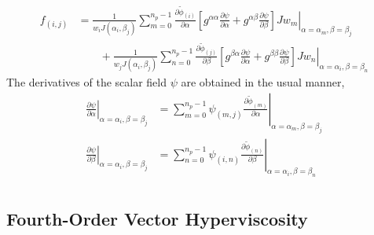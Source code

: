 \documentclass{article}
\newcommand{\pdiff}[2]{\frac{\partial #1}{\partial #2}}
\begin{document}
\begin{align}
f_{(i,j)} &= \frac{1}{w_i J(\alpha_i, \beta_j)} \sum_{m=0}^{n_p-1} \pdiff{\tilde{\phi}_{(i)}}{\alpha} \left. \left[ g^{\alpha \alpha} \pdiff{\psi}{\alpha} + g^{\alpha \beta} \pdiff{\psi}{\beta} \right] J w_m \right\vert_{\alpha = \alpha_m, \beta = \beta_j} \nonumber \\
& \qquad + \frac{1}{w_j J(\alpha_i, \beta_j)} \sum_{n=0}^{n_p-1} \pdiff{\tilde{\phi}_{(j)}}{\beta} \left. \left[ g^{\beta \alpha} \pdiff{\psi}{\alpha} + g^{\beta \beta} \pdiff{\psi}{\beta} \right] J w_n \right\vert_{\alpha = \alpha_i, \beta = \beta_n}
\end{align}  The derivatives of the scalar field $\psi$ are obtained in the usual manner,
\begin{align}
\left. \pdiff{\psi}{\alpha} \right\vert_{\alpha = \alpha_i, \beta = \beta_j} &= \sum_{m=0}^{n_p-1} \left. \psi_{(m,j)} \pdiff{\tilde{\phi}_{(m)}}{\alpha} \right\vert_{\alpha = \alpha_m, \beta = \beta_j} \\
\left. \pdiff{\psi}{\beta} \right\vert_{\alpha = \alpha_i, \beta = \beta_j} &= \sum_{n=0}^{n_p-1} \left. \psi_{(i,n)} \pdiff{\tilde{\phi}_{(n)}}{\beta} \right\vert_{\alpha = \alpha_i, \beta = \beta_n} \\
\end{align}


\subsection{Fourth-Order Vector Hyperviscosity} \label{sec:VectorHyperviscosity}
\end{document}
